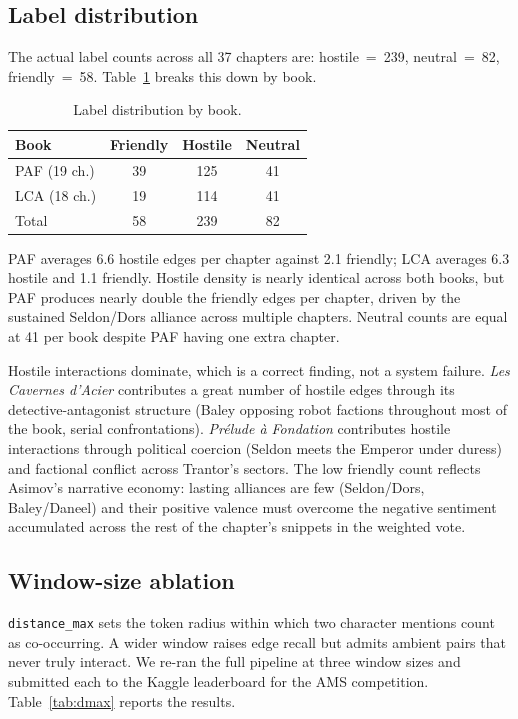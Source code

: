 \documentclass[a4paper]{article}
\begin{document}
\subsection{Label distribution}

The actual label counts across all 37 chapters are:
hostile~=~239, neutral~=~82, friendly~=~58.
Table~\ref{tab:labels} breaks this down by book.

\begin{table}[h]
\centering
\caption{Label distribution by book.}
\label{tab:labels}
\small
\begin{tabular}{lccc}
\toprule
\textbf{Book} & \textbf{Friendly} & \textbf{Hostile} & \textbf{Neutral} \\
\midrule
PAF (19 ch.) & 39 & 125 & 41 \\
LCA (18 ch.) & 19 & 114 & 41 \\
\midrule
Total        & 58 & 239 & 82 \\
\bottomrule
\end{tabular}
\end{table}

PAF averages 6.6 hostile edges per chapter against 2.1 friendly; LCA averages 6.3 hostile and 1.1 friendly. Hostile density is nearly identical across both books, but PAF produces nearly double the friendly edges per chapter, driven by the sustained Seldon/Dors alliance across multiple chapters. Neutral counts are equal at 41 per book despite PAF having one extra chapter.

Hostile interactions dominate, which is a correct finding, not a system
failure. \textit{Les Cavernes d'Acier} contributes a great number of hostile
edges through its detective-antagonist structure (Baley opposing robot
factions throughout most of the book, serial confrontations). \textit{Prélude à Fondation} contributes
hostile interactions through political coercion (Seldon meets the Emperor
under duress) and factional conflict across Trantor's sectors.
The low friendly count reflects Asimov's narrative economy: lasting alliances
are few (Seldon/Dors, Baley/Daneel) and their positive valence must
overcome the negative sentiment accumulated across the rest of the
chapter's snippets in the weighted vote.

\subsection{Window-size ablation}

\texttt{distance\_max} sets the token radius within which two
character mentions count as co-occurring. A wider window raises
edge recall but admits ambient pairs that never truly interact.
We re-ran the full pipeline at three window sizes and submitted
each to the Kaggle leaderboard for the AMS competition.
Table~\ref{tab:dmax} reports the results.
\end{document}
